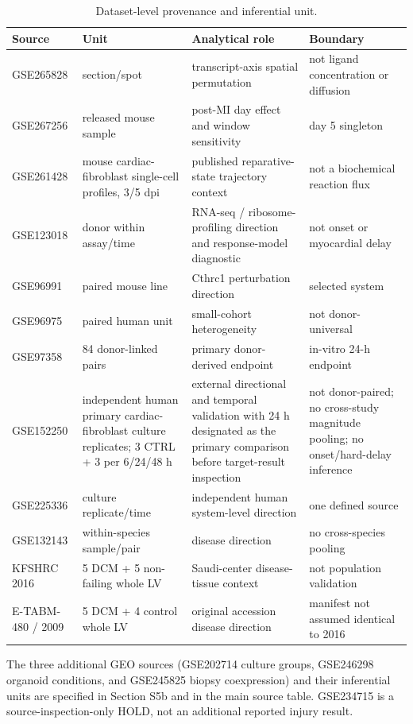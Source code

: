 \documentclass[11pt]{article}
\begin{document}
\begin{table}[H]\centering\caption{Dataset-level provenance and inferential unit.}\label{tab:sources}\scriptsize
\begin{tabularx}{\linewidth}{p{2.0cm}p{2.7cm}YY}
\toprule \textbf{Source} & \textbf{Unit} & \textbf{Analytical role} & \textbf{Boundary}\\\midrule
GSE265828 & section/spot & transcript-axis spatial permutation & not ligand concentration or diffusion\\
GSE267256 & released mouse sample & post-MI day effect and window sensitivity & day 5 singleton\\
GSE261428 & mouse cardiac-fibroblast single-cell profiles, 3/5 dpi & published reparative-state trajectory context & not a biochemical reaction flux\\
GSE123018 & donor within assay/time & RNA-seq / ribosome-profiling direction and response-model diagnostic & not onset or myocardial delay\\
GSE96991 & paired mouse line & Cthrc1 perturbation direction & selected system\\
GSE96975 & paired human unit & small-cohort heterogeneity & not donor-universal\\
GSE97358 & 84 donor-linked pairs & primary donor-derived \cthrc{} endpoint & in-vitro 24-h endpoint\\
GSE152250 & independent human primary cardiac-fibroblast culture replicates; 3 CTRL + 3 \tgfb{} per 6/24/48 h & external \cthrc{} directional and temporal validation with 24 h designated as the primary comparison before target-result inspection & not donor-paired; no cross-study magnitude pooling; no onset/hard-delay inference\\
GSE225336 & culture replicate/time & independent human system-level direction & one defined source\\
GSE132143 & within-species sample/pair & disease direction & no cross-species pooling\\
KFSHRC 2016 & 5 DCM + 5 non-failing whole LV & Saudi-center disease-tissue context & not population validation\\
E-TABM-480 / 2009 & 5 DCM + 4 control whole LV & original accession disease direction & manifest not assumed identical to 2016\\\bottomrule
\end{tabularx}\end{table}

The three additional GEO sources (GSE202714 culture groups, GSE246298 organoid conditions, and GSE245825 biopsy coexpression) and their inferential units are specified in Section S5b and in the main source table. GSE234715 is a source-inspection-only HOLD, not an additional reported injury result.
\end{document}
